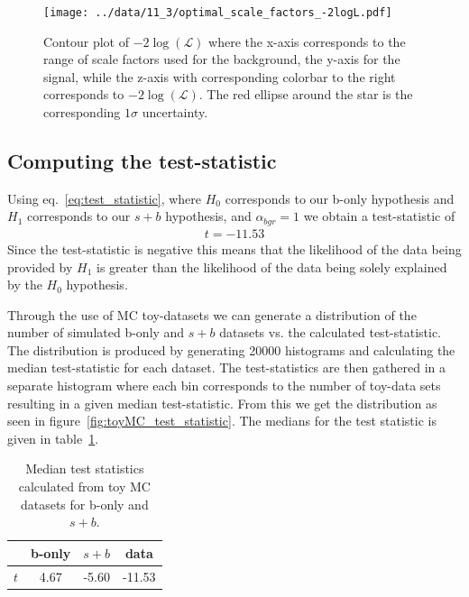 \documentclass[12pt,a4paper]{amsart}
\begin{document}
\begin{figure}
\centering
\texttt{[image: ../data/11\_3/optimal\_scale\_factors\_-2logL.pdf]}
\caption{Contour plot of $-2\log(\mathcal{L})$ where the x-axis corresponds to the range of scale factors used for the background, the y-axis for the signal, while the z-axis with corresponding colorbar to the right corresponds to $-2\log(\mathcal{L})$. The red ellipse around the star is the corresponding $1\sigma$ uncertainty.}
\label{fig:optimal_scalefactors_contourPlot}
\end{figure}

\subsection{Computing the test-statistic} \label{subsec:Analysis-(computing the test-statistic)}
Using eq.~\eqref{eq:test_statistic}, where $H_0$ corresponds to our b-only hypothesis and $H_1$ corresponds to our $s+b$ hypothesis, and $\alpha_{bgr} = 1$ we obtain a test-statistic of
\begin{align}
t = -11.53
\end{align}
Since the test-statistic is negative this means that the likelihood of the data being provided by $H_1$ is greater than the likelihood of the data being solely explained by the $H_0$ hypothesis.

Through the use of MC toy-datasets we can generate a distribution of the number of simulated b-only and $s+b$ datasets vs. the calculated test-statistic. The distribution is produced by generating 20000 histograms and calculating the median test-statistic for each dataset. The test-statistics are then gathered in a separate histogram where each bin corresponds to the number of toy-data sets resulting in a given median test-statistic. From this we get the distribution as seen in figure~\ref{fig:toyMC_test_statistic}. The medians for the test statistic is given in table~\ref{tab:toyMC_test_statistic_median}.

\begin{table}[]
\caption{Median test statistics calculated from toy MC datasets for b-only and $s+b$.}
\label{tab:toyMC_test_statistic_median}
\begin{tabular}{cccc}
\hline\hline
       & b-only & $s+b$ & data\\ \hline
$t$ & 4.67   & -5.60   & -11.53    \\ \hline\hline
\end{tabular}
\end{table}
\end{document}
